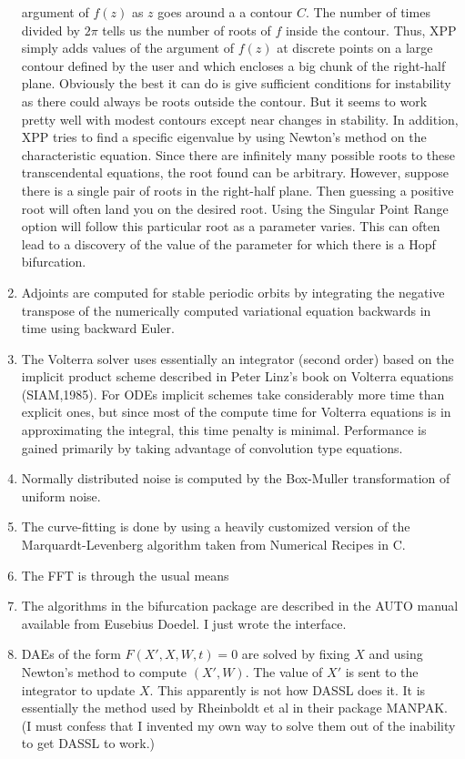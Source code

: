 \documentclass{article}
\begin{document}
\begin{enumerate}
argument of $f(z)$ as $z$ goes around a a contour $C.$ The number of
times divided by $2\pi$ tells us the number of roots of $f$ inside the
contour. Thus, XPP simply adds values of the argument of $f(z)$ at
discrete points on a large contour defined by the user and which
encloses a big chunk of the right-half plane.  Obviously the best it
can do is give sufficient conditions for instability as there could
always be roots outside the contour. But it seems to work pretty well
with modest contours except near changes in stability. In addition,
XPP tries to find a specific eigenvalue by using Newton's method on
the characteristic equation. Since there are infinitely many possible
roots to these transcendental equations, the root found can be
arbitrary. However, suppose there is a single pair of roots in the
right-half plane. Then guessing a positive root will often land you on
the desired root. Using the Singular Point Range option will follow
this particular root as a parameter varies. This can often lead to a
discovery of the value of the parameter for which there is a Hopf
bifurcation.
   

\item Adjoints are computed for stable periodic
 orbits by integrating the negative transpose of the numerically computed
 variational equation backwards in time using backward Euler.

\item The Volterra solver uses essentially an integrator (second order)
based on the implicit product scheme described in Peter Linz's book on
Volterra equations (SIAM,1985). For ODEs implicit schemes take
considerably more time than explicit ones, but since most of the
compute time for Volterra equations is in approximating the integral,
this time penalty is minimal.  Performance is gained primarily by
taking advantage of convolution type equations.

\item Normally distributed noise is computed by the Box-Muller
transformation of uniform noise.
\item The curve-fitting is done by using a heavily customized version
of the Marquardt-Levenberg algorithm taken from Numerical Recipes in
C. 
\item The FFT is through the usual means
\item The algorithms in the bifurcation package are described in the
AUTO manual available from Eusebius Doedel.  I just wrote the
interface.
\item DAEs of the form $F(X',X,W,t)=0$ are solved by fixing $X$ and
using Newton's method to compute $(X',W)$.  The value of $X'$ is sent
to the integrator to update $X.$  This apparently is not how DASSL
does it.  It is essentially the method used by Rheinboldt et al in
their package MANPAK. (I must confess that I invented my own way to
solve them out of the inability to get DASSL to work.)
\end{enumerate}
 
\end{document}
